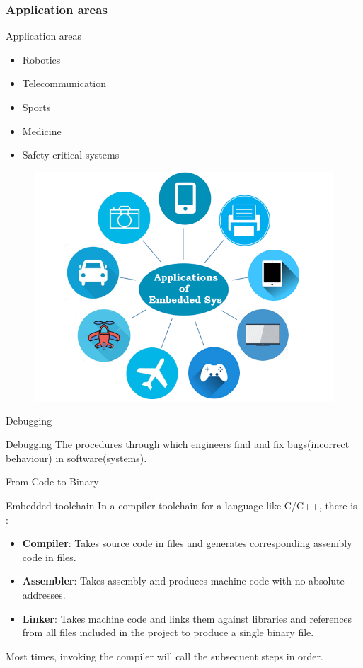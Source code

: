 \documentclass{beamer}
\begin{document}
	
\begin{frame}
		\frametitle{Application areas}
		\begin{block}{Application areas}
			\begin{itemize}
				\item Robotics
				\item Telecommunication
				\item Sports
				\item Medicine
				\item Safety critical systems
			\end{itemize}
		\end{block}
	\begin{flushleft}
		\begin{figure}
			\includegraphics[width=0.5\linewidth,height=0.3\linewidth]{images/application.png}
		\end{figure}
	\end{flushleft}
\end{frame}

\begin{frame}{Debugging}
	\begin{block}{Debugging}
		The procedures through which engineers find and fix bugs(incorrect behaviour) in software(systems).
	\end{block}
\end{frame}


	\begin{frame}{From Code to Binary}

		\begin{block}{Embedded toolchain}
			In a compiler toolchain for a language like C/C++, there is :
			\begin{itemize}
				\item \textbf{Compiler}: Takes  source code in files and generates corresponding assembly code in files.
				\item \textbf{Assembler}: Takes assembly and produces machine code with no absolute addresses. 
				\item \textbf{Linker}: Takes machine code and links them against libraries and references from all files included in the project to produce a single binary file.
			\end{itemize}
		\end{block}
		Most times, invoking the compiler will call the subsequent steps in order.
	\end{frame}
	
\end{document}
